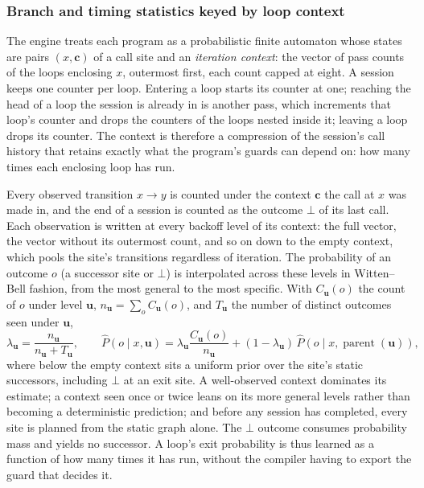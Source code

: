 \subsubsection{Branch and timing statistics keyed by loop context}
\label{subsubsec:pfa}
The engine treats each program as a probabilistic finite automaton whose states are pairs $(x,\mathbf{c})$ of a call site and an \emph{iteration context}: the vector of pass counts of the loops enclosing $x$, outermost first, each count capped at eight. A session keeps one counter per loop. Entering a loop starts its counter at one; reaching the head of a loop the session is already in is another pass, which increments that loop's counter and drops the counters of the loops nested inside it; leaving a loop drops its counter. The context is therefore a compression of the session's call history that retains exactly what the program's guards can depend on: how many times each enclosing loop has run.

Every observed transition $x\to y$ is counted under the context $\mathbf{c}$ the call at $x$ was made in, and the end of a session is counted as the outcome $\bot$ of its last call. Each observation is written at every backoff level of its context: the full vector, the vector without its outermost count, and so on down to the empty context, which pools the site's transitions regardless of iteration. The probability of an outcome $o$ (a successor site or $\bot$) is interpolated across these levels in Witten--Bell fashion, from the most general to the most specific. With $C_{\mathbf{u}}(o)$ the count of $o$ under level $\mathbf{u}$, $n_{\mathbf{u}}=\sum_o C_{\mathbf{u}}(o)$, and $T_{\mathbf{u}}$ the number of distinct outcomes seen under $\mathbf{u}$,
\[
\lambda_{\mathbf{u}}=\frac{n_{\mathbf{u}}}{n_{\mathbf{u}}+T_{\mathbf{u}}},\qquad
\widehat{P}(o\mid x,\mathbf{u})=\lambda_{\mathbf{u}}\frac{C_{\mathbf{u}}(o)}{n_{\mathbf{u}}}+(1-\lambda_{\mathbf{u}})\,\widehat{P}(o\mid x,\operatorname{parent}(\mathbf{u})),
\]
where below the empty context sits a uniform prior over the site's static successors, including $\bot$ at an exit site. A well-observed context dominates its estimate; a context seen once or twice leans on its more general levels rather than becoming a deterministic prediction; and before any session has completed, every site is planned from the static graph alone. The $\bot$ outcome consumes probability mass and yields no successor. A loop's exit probability is thus learned as a function of how many times it has run, without the compiler having to export the guard that decides it.


